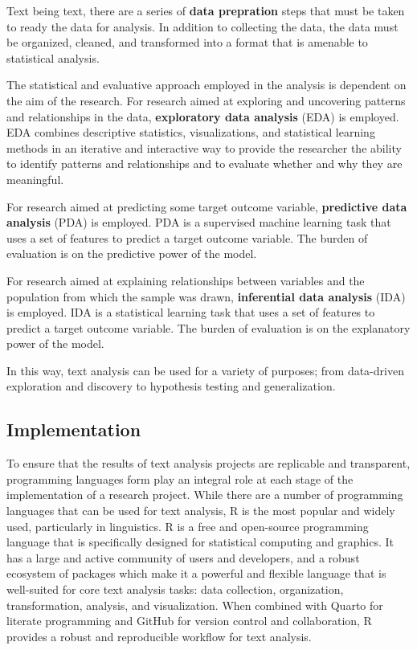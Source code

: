 \documentclass[
  letterpaper,
]{latex/krantz}
\begin{document}
Text being text, there are a series of \textbf{data prepration} steps
that must be taken to ready the data for analysis. In addition to
collecting the data, the data must be organized, cleaned, and
transformed into a format that is amenable to statistical analysis.

The statistical and evaluative approach employed in the analysis is
dependent on the aim of the research. For research aimed at exploring
and uncovering patterns and relationships in the data,
\textbf{exploratory data analysis} (EDA) is employed. EDA combines
descriptive statistics, visualizations, and statistical learning methods
in an iterative and interactive way to provide the researcher the
ability to identify patterns and relationships and to evaluate whether
and why they are meaningful.

For research aimed at predicting some target outcome variable,
\textbf{predictive data analysis} (PDA) is employed. PDA is a supervised
machine learning task that uses a set of features to predict a target
outcome variable. The burden of evaluation is on the predictive power of
the model.

For research aimed at explaining relationships between variables and the
population from which the sample was drawn, \textbf{inferential data
analysis} (IDA) is employed. IDA is a statistical learning task that
uses a set of features to predict a target outcome variable. The burden
of evaluation is on the explanatory power of the model.

In this way, text analysis can be used for a variety of purposes; from
data-driven exploration and discovery to hypothesis testing and
generalization.

\hypertarget{implementation}{%
\subsection{Implementation}\label{implementation}}

To ensure that the results of text analysis projects are replicable and
transparent, programming languages form play an integral role at each
stage of the implementation of a research project. While there are a
number of programming languages that can be used for text analysis, R is
the most popular and widely used, particularly in linguistics. R is a
free and open-source programming language that is specifically designed
for statistical computing and graphics. It has a large and active
community of users and developers, and a robust ecosystem of packages
which make it a powerful and flexible language that is well-suited for
core text analysis tasks: data collection, organization, transformation,
analysis, and visualization. When combined with Quarto for literate
programming and GitHub for version control and collaboration, R provides
a robust and reproducible workflow for text analysis.
\end{document}
